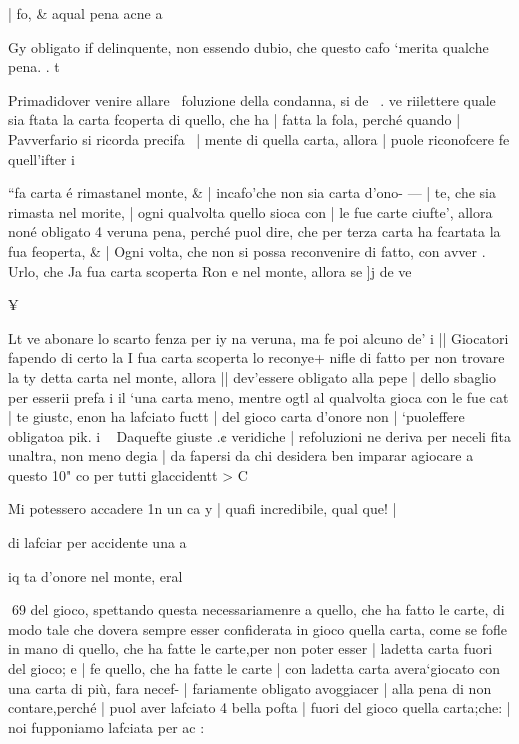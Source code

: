 \documentclass[12pt,a6paper]{article}
\begin{document}
| fo, & aqual pena acne a

 

 

 

 

 

 
  
  

Gy
obligato if delinquente, non
essendo dubio, che questo cafo
‘merita qualche pena. . t

Primadidover venire allare~
foluzione della condanna, si de~ .
ve riilettere quale sia ftata la
carta fcoperta di quello, che ha |
fatta la fola, perché quando |
Pavverfario si ricorda precifa~ |
mente di quella carta, allora |
puole riconofcere fe quell’ifter i

“fa carta é rimastanel monte, & |
incafo'che non sia carta d’ono- — |
te, che sia rimasta nel morite, |
ogni qualvolta quello sioca con |
le fue carte ciufte’, allora noné
obligato 4 veruna pena, perché
puol dire, che per terza carta
ha fcartata la fua feoperta, & |
Ogni volta, che non si possa reconvenire di fatto, con avver
. Urlo, che Ja fua carta scoperta
Ron e nel monte, allora se ]j de
ve

 

 

¥

 
 

Lt ve abonare lo scarto fenza per
iy na veruna, ma fe poi alcuno de’
i || Giocatori fapendo di certo la
I fua carta scoperta lo reconye+ nifle di fatto per non trovare la
ty detta carta nel monte, allora
|| dev’essere obligato alla pepe
| dello sbaglio per esserii prefa
i il ‘una carta meno, mentre ogtl
al qualvolta gioca con le fue cat
| te giustc, enon ha lafciato fuctt
| del gioco carta d’onore non
| ‘puoleffere obligatoa pik.
i ~ Daquefte giuste .¢ veridiche
| refoluzioni ne deriva per neceli fita unaltra, non meno degia
| da fapersi da chi desidera ben
imparar agiocare a questo 10"
co per tutti glaccidentt > C

Mi potessero accadere 1n un ca y
| quafi incredibile, qual que!
|

 

 

di lafciar per accidente una a

iq ta d’onore nel monte, eral

 

 

 

 
69
del gioco, spettando questa necessariamenre a quello, che ha
fatto le carte, di modo tale che
dovera sempre esser confiderata
in gioco quella carta, come se
fofle in mano di quello, che ha
fatte le carte,per non poter esser |
ladetta carta fuori del gioco; e |
fe quello, che ha fatte le carte |
con ladetta carta avera‘giocato
con una carta di più, fara necef- |
fariamente obligato avoggiacer |
alla pena di non contare,perché |
puol aver lafciato 4 bella pofta |
fuori del gioco quella carta;che: |
noi fupponiamo lafciata per ac
:
\end{document}
